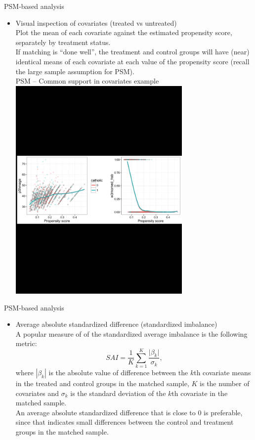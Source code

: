 \documentclass{beamer}
\begin{document}
\begin{frame}{PSM-based analysis}
\begin{itemize}
    \item Visual inspection of covariates (treated vs untreated)\\
    \medskip
    Plot the mean of each covariate against the estimated propensity score, separately by treatment status. \\ \medskip If matching is ``done well'', the treatment and control groups will have (near) identical means of each covariate at each value of the propensity score (recall the large sample assumption for PSM).\\ \medskip
    \centering
    PSM -- Common support in covariates example \\ \medskip
\includegraphics[trim = 0.4cm 23cm 0cm 23cm, clip, width=0.7\textwidth]{./IMG/PSM_vis_insp.jpg} 
\end{itemize}
\end{frame}
\begin{frame}{PSM-based analysis}
\begin{itemize}
    \item Average absolute standardized difference (standardized imbalance) \\ \medskip
    A popular measure of of the standardized average imbalance is the following metric: \\ \medskip
    $$
    \textit{SAI} = 
    \frac{1}{K} \sum_{k=1}^K \frac{\vert \beta_k \vert }{\sigma_k},
    $$
    where $| \beta_k |$ is the absolute value of difference between the $k$th covariate means in the treated and control groups in the matched sample, $K$ is the number of covariates and $\sigma_k$ is the standard deviation of the $k$th covariate in the matched sample. \\ \medskip An average absolute standardized difference that is close to 0 is preferable, since that indicates small differences between the control and treatment groups in the matched sample.
\end{itemize}
\end{frame}
\end{document}
